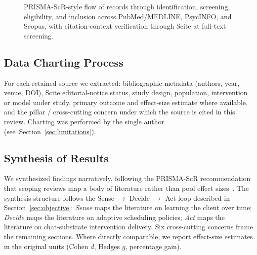 \documentclass[11pt,a4paper]{article}
\newcommand{\secref}[1]{Section~\ref{#1}}
\begin{document}
\begin{figure}[tbp]
\caption{PRISMA-ScR-style flow of records through identification,
screening, eligibility, and inclusion across PubMed/MEDLINE,
PsycINFO, and Scopus, with citation-context verification through
Scite at full-text screening.}
\label{fig:prisma}
\end{figure}

\subsection{Data Charting Process}\label{sec:charting}

For each retained source we extracted: bibliographic metadata
(authors, year, venue, DOI), Scite editorial-notice status, study
design, population, intervention or model under study, primary
outcome and effect-size estimate where available, and the pillar /
cross-cutting concern under which the source is cited in this
review. Charting was performed by the single author
(see~\secref{sec:limitations}).

\subsection{Synthesis of Results}\label{sec:synthesis-method}

We synthesized findings narratively, following the PRISMA-ScR
recommendation that scoping reviews map a body of literature rather
than pool effect sizes~\cite{Tricco2018PRISMAScR}. The synthesis
structure follows the Sense $\to$ Decide $\to$ Act loop described in
\secref{sec:objective}: \emph{Sense} maps the literature on learning
the client over time; \emph{Decide} maps the literature on adaptive
scheduling policies; \emph{Act} maps the literature on chat-substrate
intervention delivery. Six cross-cutting concerns frame the
remaining sections. Where directly comparable, we report effect-size
estimates in the original units (Cohen $d$, Hedges $g$, percentage
gain).
\end{document}
